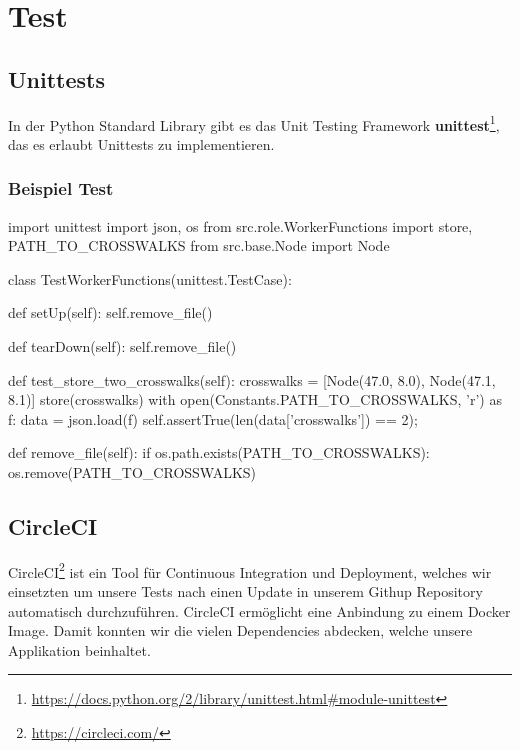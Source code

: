 \section{Test}
\subsection{Unittests}
In der Python Standard Library gibt es das Unit Testing Framework \textbf{unittest}\footnote{\url{https://docs.python.org/2/library/unittest.html\#module-unittest}}, das es erlaubt Unittests zu implementieren.

\subsubsection{Beispiel Test}
\begin{python}
import unittest
import json, os
from src.role.WorkerFunctions import store, PATH_TO_CROSSWALKS
from src.base.Node import Node

class TestWorkerFunctions(unittest.TestCase):

    def setUp(self):
        self.remove_file()

    def tearDown(self):
        self.remove_file()
        
    def test_store_two_crosswalks(self):
        crosswalks = [Node(47.0, 8.0), Node(47.1, 8.1)]
        store(crosswalks)
        with open(Constants.PATH_TO_CROSSWALKS, 'r') as f:
            data = json.load(f)
        self.assertTrue(len(data['crosswalks']) == 2);
        
    def remove_file(self):
        if os.path.exists(PATH_TO_CROSSWALKS):
            os.remove(PATH_TO_CROSSWALKS) 
\end{python}
\subsection{CircleCI}
\Gls{CircleCI}\footnote{\url{https://circleci.com/}} ist ein Tool für Continuous Integration und Deployment, welches wir einsetzten um unsere Tests nach einen Update in unserem Githup Repository automatisch durchzuführen. CircleCI ermöglicht eine Anbindung zu einem Docker Image. Damit konnten wir die vielen Dependencies abdecken, welche unsere Applikation beinhaltet.
